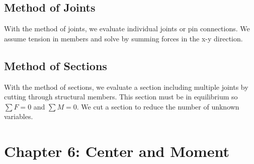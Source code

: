 \documentclass{article}
\begin{document}
    \subsection{Method of Joints}
    With the method of joints, we evaluate individual joints or pin connections. We assume tension in members and solve by summing forces in the x-y direction.

    \subsection{Method of Sections}
    With the method of sections, we evaluate a section including multiple joints by cutting through structural members. This section must be in equilibrium so $\sum F=0$ and  $\sum M=0$. 
    We cut a section to reduce the number of unknown variables.

    

    \section{Chapter 6: Center and Moment}
    
\end{document}
